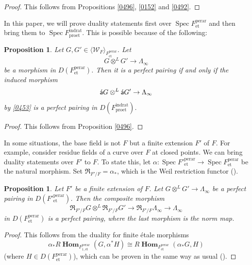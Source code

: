 \documentclass{amsart}
\newtheorem{Prop}[Thm]{Proposition}
\theoremstyle{remark}
\numberwithin{equation}{subsection}
\newcommand{\tensor}{\mathbin{\otimes}}
\newcommand{\et}{\mathrm{et}}
\newcommand{\rat}{\mathrm{rat}}
\newcommand{\ind}{\mathrm{ind}}
\newcommand{\pro}{\mathrm{pro}}
\newcommand{\perar}{\mathrm{perar}}
\newcommand{\alg}[1]{\mathbf{#1}}
\newcommand{\algebrize}{\Acute{\mathsf{a}}}
\newcommand{\genby}[1]{\langle #1 \rangle}
\newcommand{\Weil}{\mathfrak{R}}
\DeclareMathOperator{\Spec}{Spec}
\DeclareMathOperator{\sheafhom}{\alg{Hom}}
\begin{document}
\begin{proof}
	This follows from Propositions \ref{0496}, \ref{0152} and \ref{0492}.
\end{proof}

In this paper, we will prove duality statements first over $\Spec F^{\perar}_{\et}$
and then bring them to $\Spec F^{\ind\rat}_{\pro\et}$.
This is possible because of the following:

\begin{Prop} \label{0010}
	Let $G, G' \in \genby{\mathcal{W}_{F}}_{F^{\perar}_{\et}}$.
	Let
		\[
				G \tensor^{L} G' \to \Lambda_{\infty}
		\]
	be a morphism in $D(F^{\perar}_{\et})$.
	Then it is a perfect pairing if and only if the induced morphism
		\[
				\algebrize G \tensor^{L} \algebrize G'
			\to
				\Lambda_{\infty}
		\]
	by \eqref{0453} is a perfect pairing in $D(F^{\ind\rat}_{\pro\et})$.
\end{Prop}

\begin{proof}
	This follows from Proposition \ref{0496}.
\end{proof}

In some situations, the base field is not $F$ but a finite extension $F'$ of $F$.
For example, consider residue fields of a curve over $F$ at closed points.
We can bring duality statements over $F'$ to $F$.
To state this, let $\alpha \colon \Spec F'^{\perar}_{\et} \to \Spec F^{\perar}_{\et}$ be the natural morphism.
Set $\Weil_{F' / F} = \alpha_{\ast}$,
which is the Weil restriction functor (\cite[\S 7.6]{BLR90}).

\begin{Prop} \label{0452}
	Let $F'$ be a finite extension of $F$.
	Let $G \tensor^{L} G' \to \Lambda_{\infty}$ be a perfect pairing in $D(F'^{\perar}_{\et})$.
	Then the composite morphism
		\[
					\Weil_{F' / F} G
				\tensor^{L}
					\Weil_{F' / F} G'
			\to
				\Weil_{F' / F} \Lambda_{\infty}
			\to
				\Lambda_{\infty}
		\]
	in $D(F^{\perar}_{\et})$ is a perfect pairing,
	where the last morphism is the norm map.
\end{Prop}

\begin{proof}
	This follows from the duality for finite \'etale morphisms
		\[
				\alpha_{\ast}
				R \sheafhom_{F^{\perar}_{1, \et}}(G, \alpha^{\ast} H)
			\cong
				R \sheafhom_{F^{\perar}_{\et}}(\alpha_{\ast} G, H)
		\]
	(where $H \in D(F^{\perar}_{\et})$),
	which can be proven in the same way as usual
	(\cite[Chapter V, Proposition 1.13]{Mil80}).
\end{proof}
\end{document}
